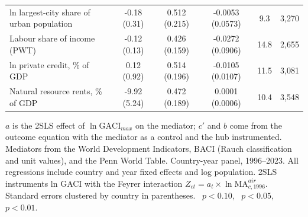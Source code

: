 \begin{table}[H]
\begin{minipage}{\linewidth}
{\begin{tabular}{lccccc}
ln largest-city share of urban population & -0.18 (0.31) & 0.512\sym{**} (0.215) & -0.0053 (0.0573) & 9.3 & 3{,}270 \\
Labour share of income (PWT) & -0.12 (0.13) & 0.426\sym{***} (0.159) & -0.0272 (0.0906) & 14.8 & 2{,}655 \\
ln private credit, \% of GDP & 0.12 (0.92) & 0.514\sym{***} (0.196) & -0.0105 (0.0107) & 11.5 & 3{,}081 \\
Natural resource rents, \% of GDP & -9.92\sym{*} (5.24) & 0.472\sym{**} (0.189) & 0.0001 (0.0006) & 10.4 & 3{,}548 \\
\bottomrule
\end{tabular}}
\par\vspace{3pt}\begin{flushleft}\footnotesize $a$ is the 2SLS effect of $\ln\mathrm{GACI}_{max}$ on the mediator; $c'$ and $b$ come from the outcome equation with the mediator as a control and the hub instrumented. Mediators from the World Development Indicators, BACI (Rauch classification and unit values), and the Penn World Table. Country-year panel, 1996--2023. All regressions include country and year fixed effects and log population. 2SLS instruments ln GACI with the Feyrer interaction $Z_{ct}=a_t\times\ln \mathrm{MA}^{air}_{c,1996}$. Standard errors clustered by country in parentheses. \sym{*}~$p<0.10$, \sym{**}~$p<0.05$, \sym{***}~$p<0.01$.\end{flushleft}
\end{minipage}
\end{table}
